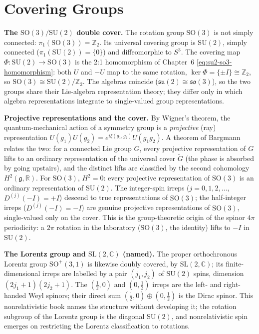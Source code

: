 \section{Covering Groups}
\label{sec:appendix-covering}

\medskip\noindent\textbf{The $\mathrm{SO}(3)/\mathrm{SU}(2)$ double cover.} The rotation group $\mathrm{SO}(3)$ is not simply connected: $\pi_{1}(\mathrm{SO}(3))=\mathbb Z_{2}$. Its universal covering group is $\mathrm{SU}(2)$, simply connected ($\pi_{1}(\mathrm{SU}(2))=\{0\}$) and diffeomorphic to $S^{3}$. The covering map $\Phi:\mathrm{SU}(2)\to\mathrm{SO}(3)$ is the 2:1 homomorphism of Chapter~6 \eqref{eq:su2-so3-homomorphism}: both $U$ and $-U$ map to the same rotation, $\ker\Phi=\{\pm I\}\cong\mathbb Z_{2}$, so $\mathrm{SO}(3)\cong\mathrm{SU}(2)/\mathbb Z_{2}$. The algebras coincide ($\mathfrak{su}(2)\cong\mathfrak{so}(3)$), so the two groups share their Lie-algebra representation theory; they differ only in which algebra representations integrate to single-valued group representations.

\medskip\noindent\textbf{Projective representations and the cover.} By Wigner's theorem, the quantum-mechanical action of a symmetry group is a \emph{projective} (ray) representation $U(g_{1})U(g_{2})=e^{i\xi(g_{1},g_{2})}U(g_{1}g_{2})$. A theorem of Bargmann relates the two: for a connected Lie group $G$, every projective representation of $G$ lifts to an ordinary representation of the universal cover $\tilde G$ (the phase is absorbed by going upstairs), and the distinct lifts are classified by the second cohomology $H^{2}(\mathfrak g,\mathbb R)$. For $\mathrm{SO}(3)$, $H^{2}=0$: every projective representation of $\mathrm{SO}(3)$ is an ordinary representation of $\mathrm{SU}(2)$. The integer-spin irreps ($j=0,1,2,\ldots$, $D^{(j)}(-I)=+I$) descend to true representations of $\mathrm{SO}(3)$; the half-integer irreps ($D^{(j)}(-I)=-I$) are genuine projective representations of $\mathrm{SO}(3)$, single-valued only on the cover. This is the group-theoretic origin of the spinor $4\pi$ periodicity: a $2\pi$ rotation in the laboratory ($\mathrm{SO}(3)$, the identity) lifts to $-I$ in $\mathrm{SU}(2)$.

\medskip\noindent\textbf{The Lorentz group and $\mathrm{SL}(2,\mathbb C)$ (named).} The proper orthochronous Lorentz group $\mathrm{SO}^{+}(3,1)$ is likewise doubly covered, by $\mathrm{SL}(2,\mathbb C)$; its finite-dimensional irreps are labelled by a pair $(j_{1},j_{2})$ of $\mathrm{SU}(2)$ spins, dimension $(2j_{1}+1)(2j_{2}+1)$. The $(\tfrac12,0)$ and $(0,\tfrac12)$ irreps are the left- and right-handed Weyl spinors; their direct sum $(\tfrac12,0)\oplus(0,\tfrac12)$ is the Dirac spinor. This nonrelativistic book names the structure without developing it; the rotation subgroup of the Lorentz group is the diagonal $\mathrm{SU}(2)$, and nonrelativistic spin emerges on restricting the Lorentz classification to rotations.

